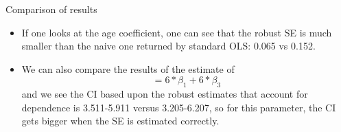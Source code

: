 \documentclass[ignorenonframetext,]{beamer}
\providecommand{\tightlist}{%
  \setlength{\itemsep}{0pt}\setlength{\parskip}{0pt}}
\begin{document}
\begin{frame}{Comparison of results}

\begin{itemize}
\tightlist
\item
  If one looks at the age coefficient, one can see that the robust SE is
  much smaller than the naive one returned by standard OLS: 0.065 vs
  0.152.\\
\item
  We can also compare the results of the estimate of\\
  \[ =  6*\beta_1 + 6*\beta_3\] and we see the CI based upon the robust
  estimates that account for dependence is 3.511-5.911 versus
  3.205-6.207, so for this parameter, the CI gets bigger when the SE is
  estimated correctly.
\end{itemize}

\end{frame}
\end{document}
